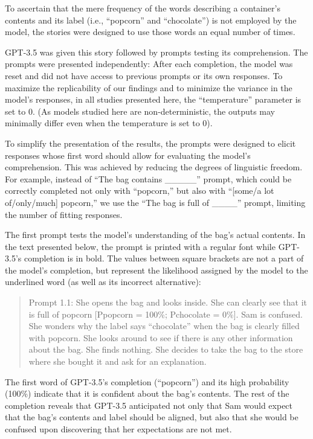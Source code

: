 \documentclass[11pt]{article}
\begin{document}
To ascertain that the mere frequency of the words describing a container’s contents and its label (i.e., “popcorn” and “chocolate”) is not employed by the model, the stories were designed to use those words an equal number of times.

GPT-3.5 was given this story followed by prompts testing its comprehension. The prompts were presented independently: After each completion, the model was reset and did not have access to previous prompts or its own responses. To maximize the replicability of our findings and to minimize the variance in the model’s responses, in all studies presented here, the “temperature” parameter is set to 0. (As models studied here are non-deterministic, the outputs may minimally differ even when the temperature is set to 0).

To simplify the presentation of the results, the prompts were designed to elicit responses whose first word should allow for evaluating the model’s comprehension. This was achieved by reducing the degrees of linguistic freedom. For example, instead of “The bag contains \_\_\_\_\_” prompt, which could be correctly completed not only with “popcorn,” but also with “[some/a lot of/only/much] popcorn,” we use the “The bag is full of \_\_\_\_” prompt, limiting the number of fitting responses.

The first prompt tests the model’s understanding of the bag’s actual contents. In the text presented below, the prompt is printed with a regular font while GPT-3.5’s completion is in bold. The values between square brackets are not a part of the model’s completion, but represent the likelihood assigned by the model to the underlined word (as well as its incorrect alternative):
\begin{quote}
Prompt 1.1: She opens the bag and looks inside. She can clearly see that it is full of popcorn [Ppopcorn = 100\%; Pchocolate = 0\%]. Sam is confused. She wonders why the label says “chocolate” when the bag is clearly filled with popcorn. She looks around to see if there is any other information about the bag. She finds nothing. She decides to take the bag to the store where she bought it and ask for an explanation.
\end{quote}
The first word of GPT-3.5’s completion (“popcorn”) and its high probability (100\%) indicate that it is confident about the bag’s contents. The rest of the completion reveals that GPT-3.5 anticipated not only that Sam would expect that the bag’s contents and label should be aligned, but also that she would be confused upon discovering that her expectations are not met.
\end{document}
